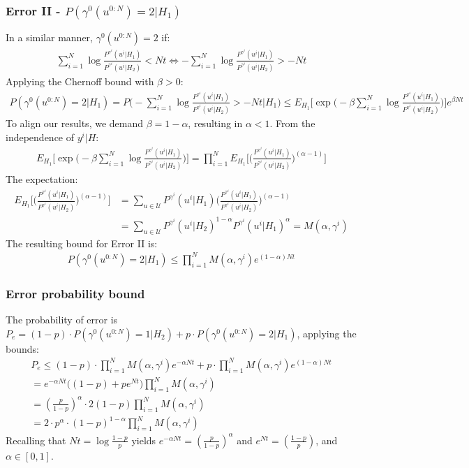 \documentclass[11pt]{article}
\begin{document}
\subsubsection*{Error II - $P(\gamma^0(u^{0:N}) = 2|H_1)$}
In a similar manner, $\gamma^0(u^{0:N}) = 2$ if:
\begin{align}
    \sum_{i=1}^{N}\log\frac{P^{\gamma^i}(u^i|H_1)}{P^{\gamma^i}(u^i|H_2)} < Nt \iff -\sum_{i=1}^{N}\log\frac{P^{\gamma^i}(u^i|H_1)}{P^{\gamma^i}(u^i|H_2)} > -Nt
\end{align}
Applying the Chernoff bound with $\beta > 0$:
\begin{align}
    P(\gamma^0(u^{0:N}) = 2|H_1) = P\bigg(-\sum_{i=1}^{N}\log\frac{P^{\gamma^i}(u^i|H_1)}{P^{\gamma^i}(u^i|H_2)} > -Nt\bigg|H_1\bigg) \leq E_{H_1}\bigg[\exp\bigg(-\beta \sum_{i=1}^{N}\log\frac{P^{\gamma^i}(u^i|H_1)}{P^{\gamma^i}(u^i|H_2)}\bigg)\bigg]e^{\beta Nt}
\end{align}
To align our results, we demand $\beta = 1-\alpha$, resulting in $\alpha < 1$. From the independence of $y^i|H$:
\begin{align}
    E_{H_1}\bigg[\exp\bigg(-\beta \sum_{i=1}^{N}\log\frac{P^{\gamma^i}(u^i|H_1)}{P^{\gamma^i}(u^i|H_2)}\bigg)\bigg] = \prod_{i=1}^{N}E_{H_1}\bigg[\bigg(\frac{P^{\gamma^i}(u^i|H_1)}{P^{\gamma^i}(u^i|H_2)}\bigg)^{(\alpha-1)}\bigg]
\end{align}
The expectation:
\begin{align}
    E_{H_1}\bigg[\bigg(\frac{P^{\gamma^i}(u^i|H_1)}{P^{\gamma^i}(u^i|H_2)}\bigg)^{(\alpha - 1)}\bigg] &= \sum_{u \in \mathcal{U}}P^{\gamma^i}(u^i|H_1)\bigg(\frac{P^{\gamma^i}(u^i|H_1)}{P^{\gamma^i}(u^i|H_2)}\bigg)^{(\alpha - 1)} \\
    &= \sum_{u \in \mathcal{U}} P^{\gamma^i}(u^i|H_2)^{1-\alpha}P^{\gamma^i}(u^i|H_1)^{\alpha} = M(\alpha,\gamma^i)
\end{align}
The resulting bound for Error II is:
\begin{align*}
    P(\gamma^0(u^{0:N}) = 2|H_1) \leq \prod_{i=1}^{N}M(\alpha,\gamma^i)e^{(1-\alpha)Nt}
\end{align*}

\subsubsection*{Error probability bound}
The probability of error is $P_e = (1-p)\cdot P(\gamma^0(u^{0:N}) = 1|H_2) + p\cdot P(\gamma^0(u^{0:N}) = 2|H_1)$, applying the bounds:
\begin{align}
    P_e \leq (1-p)\cdot \prod_{i=1}^{N}M(\alpha,\gamma^i)e^{-\alpha Nt} + p\cdot \prod_{i=1}^{N}M(\alpha,\gamma^i)e^{(1-\alpha) Nt}\\
    = e^{-\alpha Nt}\bigg((1-p) + pe^{Nt}\bigg) \prod_{i=1}^{N}M(\alpha,\gamma^i)\\
    = (\frac{p}{1-p})^\alpha\cdot2(1-p)\prod_{i=1}^{N}M(\alpha,\gamma^i)\\
    =2\cdot p^\alpha \cdot (1-p)^{1-\alpha}\prod_{i=1}^{N}M(\alpha,\gamma^i)
\end{align}
Recalling that $Nt = \log\frac{1-p}{p}$ yields $e^{-\alpha Nt} = (\frac{p}{1-p})^\alpha$ and $e^{Nt} = (\frac{1-p}{p})$, and $\alpha \in [0,1]$.
\end{document}
